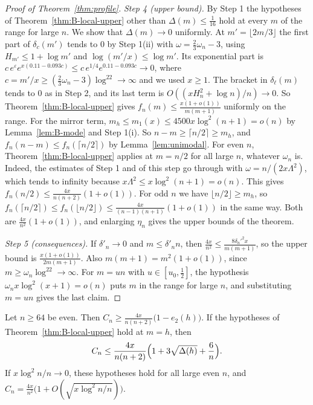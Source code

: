 \begin{proof}[Proof of Theorem~\ref{thm:profile}]
\emph{Step 4 (upper bound).} By Step 1 the hypotheses of
Theorem~\ref{thm:B-local-upper} other than $\Delta(m)\le\frac1{16}$ hold at
every $m$ of the range for large $n$. We show that $\Delta(m)\to0$
uniformly. At $m'=\lfloor2m/3\rfloor$ the first part of $\delta_c(m')$
tends to $0$ by Step 1(ii) with $\omega=\frac23\omega_n-3$, using
$H_{m'}\le1+\log m'$ and $\log(m'/x)\le\log m'$. Its exponential part is
$c\,e^\varepsilon e^{x(0.11-0.093c)}\le c\,e^{1/4}e^{0.11-0.093c}\to0$, where
$c=m'/x\ge(\frac23\omega_n-3)\log^22\to\infty$ and we used $x\ge1$. The
bracket in $\delta_\ell(m)$ tends to $0$ as in Step 2, and its last term is
$O((xH_n^2+\log n)/n)\to0$. So Theorem~\ref{thm:B-local-upper} gives
$f_n(m)\le\frac{x(1+o(1))}{m(m+1)}$ uniformly on the range. For the mirror
term, $m_h\le m_1(x)\le4500x\log^2(n+1)=o(n)$ by Lemma~\ref{lem:B-mode} and
Step 1(i). So $n-m\ge\lceil n/2\rceil\ge m_h$, and $f_n(n-m)\le f_n(\lceil n/2\rceil)$
by Lemma~\ref{lem:unimodal}. For even $n$, Theorem~\ref{thm:B-local-upper}
applies at $m=n/2$ for all large $n$, whatever $\omega_n$ is. Indeed, the
estimates of Step 1 and of this step go through with
$\omega=n/(2x\Lambda^2)$, which tends to infinity because
$x\Lambda^2\le x\log^2(n+1)=o(n)$. This gives
$f_n(n/2)\le\frac{4x}{n(n+2)}(1+o(1))$. For odd $n$ we have
$\lfloor n/2\rfloor\ge m_h$, so
$f_n(\lceil n/2\rceil)\le f_n(\lfloor n/2\rfloor)\le\frac{4x}{(n-1)(n+1)}(1+o(1))$
in the same way. Both are $\frac{4x}{n^2}(1+o(1))$, and enlarging $\eta_n$
gives the upper bounds of the theorem.

\emph{Step 5 (consequences).} If $\delta'_n\to0$ and $m\le\delta'_nn$, then
$\frac{4x}{n^2}\le\frac{8\delta_n'^2x}{m(m+1)}$, so the upper bound is
$\frac{x(1+o(1))}{2m(m+1)}$. Also $m(m+1)=m^2(1+o(1))$, since
$m\ge\omega_n\log^22\to\infty$. For $m=un$ with $u\in[u_0,\frac12]$, the
hypothesis $\omega_nx\log^2(x+1)=o(n)$ puts $m$ in the range for large $n$,
and substituting $m=un$ gives the last claim.
\end{proof}

\begin{corollary}\label{cor:B-center}
Let $n\ge64$ be even. Then $C_n\ge\frac{4x}{n(n+2)}\bigl(1-e_2(h)\bigr)$. If
the hypotheses of Theorem~\ref{thm:B-local-upper} hold at $m=h$, then
\[
 C_n\le\frac{4x}{n(n+2)}\Bigl(1+3\sqrt{\Delta(h)}+\frac6n\Bigr).
\]
If $x\log^2n/n\to0$, these hypotheses hold for all large even $n$, and
$C_n=\frac{4x}{n^2}\bigl(1+O(\sqrt{x\log^2n/n})\bigr)$.
\end{corollary}

